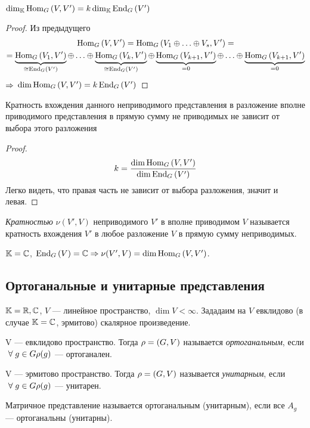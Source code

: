 \begin{stm}
	$
		\dim_{\mathbb{K}}\operatorname{Hom}_G\left(V, V'\right) = k \dim_{\mathbb{K}}\operatorname{End}_G\left(V'\right)
	$
\end{stm}
\begin{proof}
	Из предыдущего
	\begin{gather*}
		\Hom_G\hr{V, V'} = \Hom_G\hr{V_1 \sop V_s, V'} = \\
		= \ub{\Hom_G\hr{V_1, V'}}_{\cong\End_G\hr{V'}} \sop \ub{\Hom_G\hr{V_k, V'}}_{\cong\End_G\hr{V'}} \oplus
		\ub{\Hom_G\hr{V_{k + 1}, V'}}_{=0} \sop \ub{\Hom_G\hr{V_{k + 1}, V'}}_{=0}
	\end{gather*}
	$\Rightarrow$ $\dim \operatorname{Hom}_G \left(V, V'\right) = k \operatorname{End}_G\left(V'\right)$
\end{proof}
\begin{theorem}
	Кратность вхождения данного неприводимого представления
	в разложение вполне приводимого представления в прямую
	сумму не приводимых не зависит от выбора этого разложения
\end{theorem}
\begin{proof}
	$$
		k = \frac{\dim\operatorname{Hom}_G\left(V, V'\right)}{\dim\operatorname{End}_G\left(V'\right)}
	$$
	Легко видеть, что правая часть не зависит от выбора разложения, значит и левая.
\end{proof}
\begin{df}
	\textit{Кратностью} $\nu(V', V)$ неприводимого $V'$ в вполне приводимом $V$ называется
	кратность вхождения $V'$ в любое разложение $V$ в прямую сумму неприводимых.
\end{df}
\begin{imp}
	$\mathbb{K} = \mathbb{C}$, $\operatorname{End}_G\left(V\right) = \mathbb{C} \Rightarrow \nu(V', V) = \dim\operatorname{Hom}_G\left(V, V'\right)$.
\end{imp}


\subsection{Ортоганальные и унитарные представления}
$\mathbb{K} = \mathbb{R}, \mathbb{C}$, $V$ --- линейное пространство, $\dim V < \infty$.
Зададаим на $V$ евклидово (в случае $\mathbb{K} = \mathbb{C}$, эрмитово) скалярное произведение.
\begin{df}
	V --- евклидово пространство.
	Тогда $\rho = \left(G, V\right)$ называется \textit{ортоганальным}, если
	$~\forall\; g \in G \rho(g)$ --- ортоганален.

	V --- эрмитово пространство.
	Тогда $\rho = \left(G, V\right)$ называется \textit{унитарным}, если
	$~\forall\; g \in G \rho(g)$ --- унитарен.

	Матричное представление называется ортоганальным (унитарным),
	если все $A_g$ --- ортоганальны (унитарны).
\end{df}

